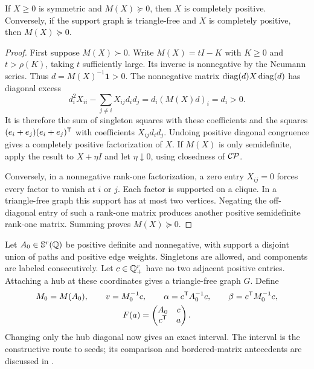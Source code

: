 \begin{lemma}\label{lem:comparison}
If $X\ge0$ is symmetric and $M(X)\succeq0$, then $X$ is completely positive. Conversely, if the support graph is triangle-free and $X$ is completely positive, then $M(X)\succeq0$.
\end{lemma}
\begin{proof}
First suppose $M(X)\succ0$. Write $M(X)=tI-K$ with $K\ge0$ and $t>\rho(K)$, taking $t$ sufficiently large. Its inverse is nonnegative by the Neumann series. Thus $d=M(X)^{-1}\mathbf1>0$. The nonnegative matrix $\operatorname{diag}(d)X\operatorname{diag}(d)$ has diagonal excess
\[
 d_i^2X_{ii}-\sum_{j\ne i}X_{ij}d_id_j
 =d_i(M(X)d)_i=d_i>0.
\]
It is therefore the sum of singleton squares with these coefficients and the squares $(e_i+e_j)(e_i+e_j)^{\mathsf T}$ with coefficients $X_{ij}d_id_j$. Undoing positive diagonal congruence gives a completely positive factorization of $X$. If $M(X)$ is only semidefinite, apply the result to $X+\eta I$ and let $\eta\downarrow0$, using closedness of $\mathcal{CP}$.

Conversely, in a nonnegative rank-one factorization, a zero entry $X_{ij}=0$ forces every factor to vanish at $i$ or $j$. Each factor is supported on a clique. In a triangle-free graph this support has at most two vertices. Negating the off-diagonal entry of such a rank-one matrix produces another positive semidefinite rank-one matrix. Summing proves $M(X)\succeq0$.
\end{proof}

Let $A_0\in\mathbb S^r(\mathbb Q)$ be positive definite and nonnegative, with support a disjoint union of paths and positive edge weights. Singletons are allowed, and components are labeled consecutively. Let $c\in\mathbb Q_+^r$ have no two adjacent positive entries. Attaching a hub at these coordinates gives a triangle-free graph $G$. Define
\begin{equation}\label{eq:thresholds}
\begin{gathered}
 M_0=M(A_0),\qquad v=M_0^{-1}c,\qquad
 \alpha=c^{\mathsf T} A_0^{-1}c,\qquad \beta=c^{\mathsf T} M_0^{-1}c,\\
 F(a)=\begin{pmatrix}A_0&c\\c^{\mathsf T}&a\end{pmatrix}.
\end{gathered}
\end{equation}
Changing only the hub diagonal now gives an exact interval. The interval is the constructive route to seeds; its comparison and bordered-matrix antecedents are discussed in \cite{Drew,Barioli}.

